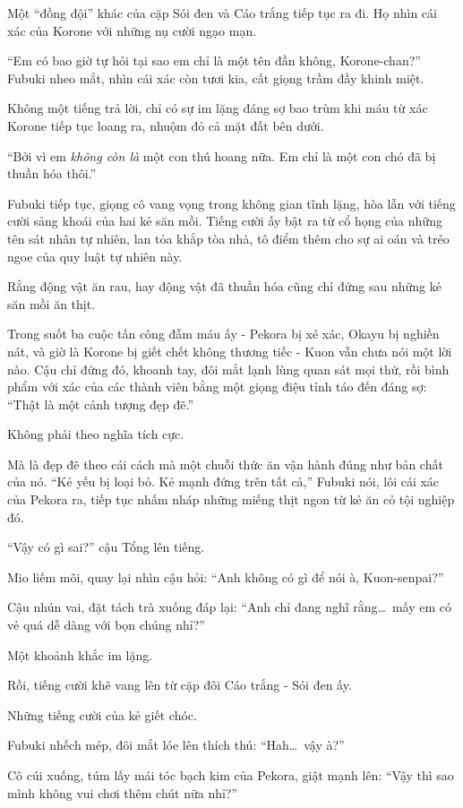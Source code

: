 \documentclass[../main.tex]{subfiles}
\begin{document}
Một ``đồng đội'' khác của cặp Sói đen và Cáo trắng tiếp tục ra đi. Họ nhìn cái xác của Korone với những nụ cười ngạo mạn.

``Em có bao giờ tự hỏi tại sao em chỉ là một tên đần không, Korone-chan?'' Fubuki nheo mắt, nhìn cái xác còn tươi kia, cất giọng trầm đầy khinh miệt.

Không một tiếng trả lời, chỉ có sự im lặng đáng sợ bao trùm khi máu từ xác Korone tiếp tục loang ra, nhuộm đỏ cả mặt đất bên dưới.

``Bởi vì em \emph{không còn là} một con thú hoang nữa. Em chỉ là một con chó đã bị thuần hóa thôi.''

Fubuki tiếp tục, giọng cô vang vọng trong không gian tĩnh lặng, hòa lẫn với tiếng cười sảng khoái của hai kẻ săn mồi. Tiếng cười ấy bật ra từ cổ họng của những tên sát nhân tự nhiên, lan tỏa khắp tòa nhà, tô điểm thêm cho sự ai oán và tréo ngoe của quy luật tự nhiên này.

Rằng động vật ăn rau, hay động vật đã thuần hóa cũng chỉ đứng sau những kẻ săn mồi ăn thịt.

Trong suốt ba cuộc tấn công đẫm máu ấy - Pekora bị xé xác, Okayu bị nghiền nát, và giờ là Korone bị giết chết không thương tiếc - Kuon vẫn chưa nói một lời nào. Cậu chỉ đứng đó, khoanh tay, đôi mắt lạnh lùng quan sát mọi thứ, rồi bình phẩm với xác của các thành viên bằng một giọng điệu tỉnh táo đến đáng sợ: ``Thật là một cảnh tượng đẹp đẽ.''

Không phải theo nghĩa tích cực.

Mà là đẹp đẽ theo cái cách mà một chuỗi thức ăn vận hành đúng như bản chất của nó. ``Kẻ yếu bị loại bỏ. Kẻ mạnh đứng trên tất cả,'' Fubuki nói, lôi cái xác của Pekora ra, tiếp tục nhấm nháp những miếng thịt ngon từ kẻ ăn cỏ tội nghiệp đó.

``Vậy có gì sai?'' cậu Tổng lên tiếng.

Mio liếm môi, quay lại nhìn cậu hỏi: ``Anh không có gì để nói à, Kuon-senpai?''

Cậu nhún vai, đặt tách trà xuống đáp lại: ``Anh chỉ đang nghĩ rằng\dots\ mấy em có vẻ quá dễ dàng với bọn chúng nhỉ?''

Một khoảnh khắc im lặng.

Rồi, tiếng cười khẽ vang lên từ cặp đôi Cáo trắng - Sói đen ấy.

Những tiếng cười của kẻ giết chóc.

Fubuki nhếch mép, đôi mắt lóe lên thích thú: ``Hah\dots\ vậy à?''

Cô cúi xuống, túm lấy mái tóc bạch kim của Pekora, giật mạnh lên: ``Vậy thì sao mình không vui chơi thêm chút nữa nhỉ?''
\end{document}
